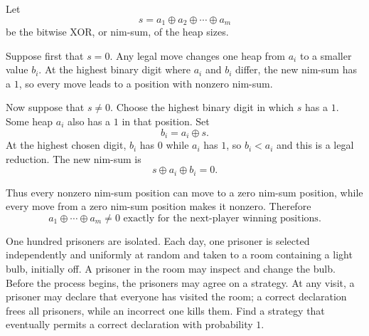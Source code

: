     \begin{solution}
        Let
        \[
            s=a_1\oplus a_2\oplus\cdots\oplus a_m
        \]
        be the bitwise XOR, or nim-sum, of the heap sizes.

        Suppose first that $s=0$. Any legal move changes one heap from $a_i$ to
        a smaller value $b_i$. At the highest binary digit where $a_i$ and
        $b_i$ differ, the new nim-sum has a $1$, so every move leads to a
        position with nonzero nim-sum.

        Now suppose that $s\neq0$. Choose the highest binary digit in which $s$
        has a $1$. Some heap $a_i$ also has a $1$ in that position. Set
        \[
            b_i=a_i\oplus s.
        \]
        At the highest chosen digit, $b_i$ has $0$ while $a_i$ has $1$, so
        $b_i<a_i$ and this is a legal reduction. The new nim-sum is
        \[
            s\oplus a_i\oplus b_i=0.
        \]

        Thus every nonzero nim-sum position can move to a zero nim-sum
        position, while every move from a zero nim-sum position makes it
        nonzero. Therefore
        \[
            \boxed{
                a_1\oplus\cdots\oplus a_m\neq0
                \text{ exactly for the next-player winning positions}
            }.
        \]
    \end{solution}

    \begin{expectedproblem}
        One hundred prisoners are isolated. Each day, one prisoner is selected
        independently and uniformly at random and taken to a room containing a
        light bulb, initially off. A prisoner in the room may inspect and change
        the bulb. Before the process begins, the prisoners may agree on a
        strategy. At any visit, a prisoner may declare that everyone has visited
        the room; a correct declaration frees all prisoners, while an incorrect
        one kills them. Find a strategy that eventually permits a correct
        declaration with probability $1$.
    \end{expectedproblem}

